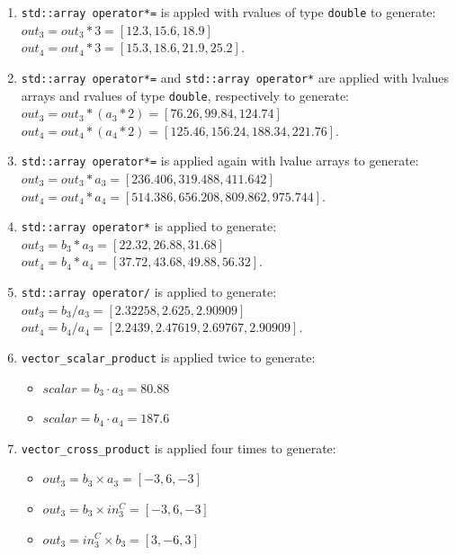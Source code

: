 \documentclass[11pt,fleqn]{report}
\begin{document}
\begin{enumerate}
    \item \texttt{std::array operator*=} is appled with rvalues of type \texttt{double} 
        to generate: \\
        $out_3 = out_3 * 3 = [12.3, 15.6, 18.9]$  \\ 
        $out_4 = out_4 * 3 = [15.3, 18.6, 21.9, 25.2]$.
    \item \texttt{std::array operator*=} and \texttt{std::array operator*} are applied with 
        lvalues arrays and rvalues of type \texttt{double}, respectively
        to generate: \\
        $out_3 = out_3 * (a_3 * 2) = [76.26, 99.84, 124.74]$  \\ 
        $out_4 = out_4 * (a_4 * 2) = [125.46, 156.24, 188.34, 221.76]$.
    \item \texttt{std::array operator*=} is applied again with lvalue arrays to generate: \\
        $out_3 = out_3 * a_3 = [236.406, 319.488, 411.642]$  \\ 
        $out_4 = out_4 * a_4 = [514.386, 656.208, 809.862, 975.744]$.
    \item \texttt{std::array operator*} is applied to generate: \\
        $out_3 = b_3 * a_3 = [22.32, 26.88, 31.68]$  \\ 
        $out_4 = b_4 * a_4 = [37.72, 43.68, 49.88, 56.32]$.
    \item \texttt{std::array operator/} is applied to generate: \\
        $out_3 = b_3 / a_3 = [2.32258, 2.625, 2.90909]$  \\ 
        $out_4 = b_4 / a_4 = [2.2439, 2.47619, 2.69767, 2.90909]$.
    \item \texttt{vector\_scalar\_product} is applied twice to generate:
        \begin{itemize}
            \item $scalar = b_3 \cdot a_3 = 80.88$ 
            \item $scalar = b_4 \cdot a_4 = 187.6$
        \end{itemize}
    \item \texttt{vector\_cross\_product} is applied four times to generate:
        \begin{itemize}
            \item $out_3 = b_3 \times a_3 = [-3, 6, -3]$ 
            \item $out_3 = b_3 \times in^C_3 = [-3, 6, -3]$ 
            \item $out_3 = in^C_3 \times b_3 = [3, -6, 3]$ 

\end{itemize}
\end{enumerate}
\end{document}
